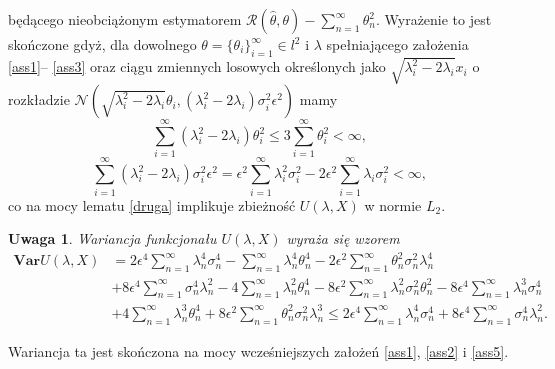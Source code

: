 \documentclass[man,mfiu]{mgrwms}
\newtheorem{uw}{Uwaga}[chapter]
\begin{document}
będącego nieobciążonym estymatorem $\mathcal{R}(\hat{\theta},\theta)-\sum_{n=1}^{\infty}\theta_n^2$. Wyrażenie to jest skończone gdyż, dla dowolnego $\theta=\{\theta_i\}_{i=1}^{\infty}\in l^2$ i $\lambda$ spełniającego założenia \ref{ass1}-- \ref{ass3} oraz ciągu zmiennych losowych określonych jako $\sqrt{\lambda_i^2-2\lambda_i}x_i$ o rozkładzie $\mathcal{N}(\sqrt{\lambda_i^2-2\lambda_i}\theta_i,(\lambda_i^2-2\lambda_i)\sigma_i^2\epsilon^2)$ mamy
\begin{displaymath}
\sum_{i=1}^{\infty}(\lambda_i^2-2\lambda_i)\theta_i^2\leq 3\sum_{i=1}^{\infty}\theta_i^2<\infty,
\end{displaymath}
\begin{displaymath}
\sum_{i=1}^{\infty}(\lambda_i^2-2\lambda_i)\sigma_i^2\epsilon^2=\epsilon^2\sum_{i=1}^{\infty}\lambda_i^2\sigma_i^2-2\epsilon^2\sum_{i=1}^{\infty}\lambda_i\sigma_i^2<\infty,
\end{displaymath}
co na mocy lematu \ref{druga} implikuje zbieżność $U(\lambda,X)$ w normie $L_2$.
\begin{uw}
Wariancja funkcjonału $U(\lambda,X)$ wyraża się wzorem
\begin{displaymath}
\begin{split}
\textbf{Var} U(\lambda,X)&=2\epsilon^4\sum_{n=1}^{\infty}\lambda_n^4\sigma_n^4-\sum_{n=1}^{\infty}\lambda_n^4\theta_n^4-2\epsilon^2\sum_{n=1}^{\infty}\theta_n^2\sigma_n^2\lambda_n^4\\
&+8\epsilon^4\sum_{n=1}^{\infty}\sigma_n^4\lambda_n^2-4\sum_{n=1}^{\infty}\lambda_n^2\theta_n^4-8\epsilon^2\sum_{n=1}^{\infty}\lambda_n^2\sigma_n^2\theta_n^2-8\epsilon^4\sum_{n=1}^{\infty}\lambda_n^3\sigma_n^4\\
&+4\sum_{n=1}^{\infty}\lambda_n^3\theta_n^4+8\epsilon^2\sum_{n=1}^{\infty}\theta_n^2\sigma_n^2\lambda_n^3 \leq 2\epsilon^4\sum_{n=1}^{\infty}\lambda_n^4\sigma_n^4+8\epsilon^4\sum_{n=1}^{\infty}\sigma_n^4\lambda_n^2.
\end{split}
\end{displaymath}
\end{uw}
Wariancja ta jest skończona na mocy wcześniejszych założeń \ref{ass1}, \ref{ass2} i \ref{ass5}.
\end{document}
